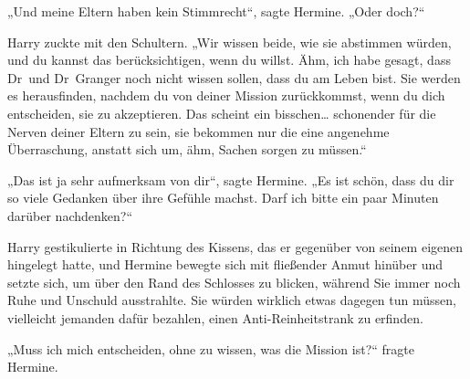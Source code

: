 „Und meine Eltern haben kein Stimmrecht“, sagte Hermine. „Oder doch?“

Harry zuckte mit den Schultern. „Wir wissen beide, wie sie abstimmen würden, und du kannst das berücksichtigen, wenn du willst. Ähm, ich habe gesagt, dass Dr~und Dr~Granger noch nicht wissen sollen, dass du am Leben bist. Sie werden es herausfinden, nachdem du von deiner Mission zurückkommst, wenn du dich entscheiden, sie zu akzeptieren. Das scheint ein bisschen… schonender für die Nerven deiner Eltern zu sein, sie bekommen nur die eine angenehme Überraschung, anstatt sich um, ähm, Sachen sorgen zu müssen.“

„Das ist ja sehr aufmerksam von dir“, sagte Hermine. „Es ist schön, dass du dir so viele Gedanken über ihre Gefühle machst. Darf ich bitte ein paar Minuten darüber nachdenken?“

Harry gestikulierte in Richtung des Kissens, das er gegenüber von seinem eigenen hingelegt hatte, und Hermine bewegte sich mit fließender Anmut hinüber und setzte sich, um über den Rand des Schlosses zu blicken, während Sie immer noch Ruhe und Unschuld ausstrahlte.
Sie würden wirklich etwas dagegen tun müssen, vielleicht jemanden dafür bezahlen, einen Anti-Reinheitstrank zu erfinden.

„Muss ich mich entscheiden, ohne zu wissen, was die Mission ist?“ fragte Hermine.

